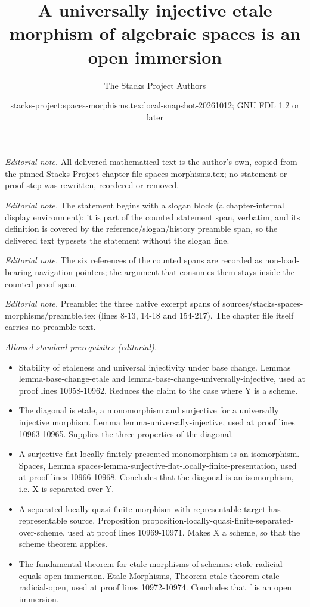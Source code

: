 \documentclass[10pt,a4paper]{amsart}
\title{A universally injective etale morphism of algebraic spaces is an open immersion}
\author{The Stacks Project Authors}
\date{stacks-project:spaces-morphisms.tex:local-snapshot-20261012; GNU FDL 1.2 or later}
\theoremstyle{plain}
\theoremstyle{definition}
\theoremstyle{remark}
\numberwithin{equation}{subsection}
\begin{document}
\maketitle
\setcounter{subsection}{1}
\noindent\textit{Editorial note.} All delivered mathematical text is the author's own, copied from the pinned Stacks Project chapter file spaces-morphisms.tex; no statement or proof step was rewritten, reordered or removed.\par\medskip
\noindent\textit{Editorial note.} The statement begins with a slogan block (a chapter-internal display environment): it is part of the counted statement span, verbatim, and its definition is covered by the reference/slogan/history preamble span, so the delivered text typesets the statement without the slogan line.\par\medskip
\noindent\textit{Editorial note.} The six references of the counted spans are recorded as non-load-bearing navigation pointers; the argument that consumes them stays inside the counted proof span.\par\medskip
\noindent\textit{Editorial note.} Preamble: the three native excerpt spans of sources/stacks-spaces-morphisms/preamble.tex (lines 8-13, 14-18 and 154-217). The chapter file itself carries no preamble text.\par\medskip
\noindent\textit{Allowed standard prerequisites (editorial).}\begin{itemize}
\item Stability of etaleness and universal injectivity under base change. Lemmas lemma-base-change-etale and lemma-base-change-universally-injective, used at proof lines 10958-10962. Reduces the claim to the case where Y is a scheme.
\item The diagonal is etale, a monomorphism and surjective for a universally injective morphism. Lemma lemma-universally-injective, used at proof lines 10963-10965. Supplies the three properties of the diagonal.
\item A surjective flat locally finitely presented monomorphism is an isomorphism. Spaces, Lemma spaces-lemma-surjective-flat-locally-finite-presentation, used at proof lines 10966-10968. Concludes that the diagonal is an isomorphism, i.e. X is separated over Y.
\item A separated locally quasi-finite morphism with representable target has representable source. Proposition proposition-locally-quasi-finite-separated-over-scheme, used at proof lines 10969-10971. Makes X a scheme, so that the scheme theorem applies.
\item The fundamental theorem for etale morphisms of schemes: etale radicial equals open immersion. Etale Morphisms, Theorem etale-theorem-etale-radicial-open, used at proof lines 10972-10974. Concludes that f is an open immersion.
\end{itemize}\medskip
\end{document}
